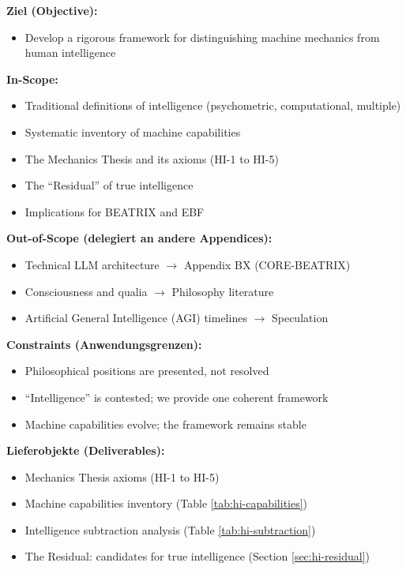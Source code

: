 \begin{tcolorbox}[
    colback=orange!5!white,
    colframe=orange!75!black,
    title={\textbf{Appendix Scope: Ziel / In-Scope / Out-of-Scope / Constraints}},
    fonttitle=\bfseries
]

\textbf{Ziel (Objective):}
\begin{itemize}[nosep]
    \item Develop a rigorous framework for distinguishing machine mechanics from human intelligence
\end{itemize}

\textbf{In-Scope:}
\begin{itemize}[nosep]
    \item Traditional definitions of intelligence (psychometric, computational, multiple)
    \item Systematic inventory of machine capabilities
    \item The Mechanics Thesis and its axioms (HI-1 to HI-5)
    \item The ``Residual'' of true intelligence
    \item Implications for BEATRIX and EBF
\end{itemize}

\textbf{Out-of-Scope (delegiert an andere Appendices):}
\begin{itemize}[nosep]
    \item Technical LLM architecture $\rightarrow$ Appendix BX (CORE-BEATRIX)
    \item Consciousness and qualia $\rightarrow$ Philosophy literature
    \item Artificial General Intelligence (AGI) timelines $\rightarrow$ Speculation
\end{itemize}

\textbf{Constraints (Anwendungsgrenzen):}
\begin{itemize}[nosep]
    \item Philosophical positions are presented, not resolved
    \item ``Intelligence'' is contested; we provide one coherent framework
    \item Machine capabilities evolve; the framework remains stable
\end{itemize}

\textbf{Lieferobjekte (Deliverables):}
\begin{itemize}[nosep]
    \item Mechanics Thesis axioms (HI-1 to HI-5)
    \item Machine capabilities inventory (Table \ref{tab:hi-capabilities})
    \item Intelligence subtraction analysis (Table \ref{tab:hi-subtraction})
    \item The Residual: candidates for true intelligence (Section \ref{sec:hi-residual})
\end{itemize}

\end{tcolorbox}


